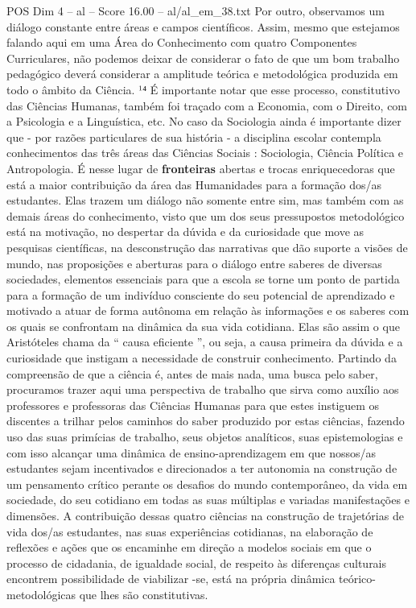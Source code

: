 \begin{textsample}{POS Dim 4 – al – Score 16.00 – al/al\_em\_38.txt}
Por outro, observamos um diálogo constante entre áreas e campos científicos.
Assim, mesmo que estejamos falando aqui em uma Área do Conhecimento com quatro Componentes Curriculares, não podemos deixar de considerar o fato de que um bom trabalho pedagógico deverá considerar a amplitude teórica e metodológica produzida em todo o âmbito da Ciência. ¹⁴ É importante notar que esse processo, constitutivo das Ciências Humanas, também foi traçado com a Economia, com o Direito, com a Psicologia e a Linguística, etc.
No caso da Sociologia ainda é importante dizer que - por razões particulares de sua história - a disciplina escolar contempla conhecimentos das três áreas das Ciências Sociais : Sociologia, Ciência Política e Antropologia.
É nesse lugar de \textbf{fronteiras} abertas e trocas enriquecedoras que está a maior contribuição da área das Humanidades para a formação dos/as estudantes.
Elas trazem um diálogo não somente entre sim, mas também com as demais áreas do conhecimento, visto que um dos seus pressupostos metodológico está na motivação, no despertar da dúvida e da curiosidade que move as pesquisas científicas, na desconstrução das narrativas que dão suporte a visões de mundo, nas proposições e aberturas para o diálogo entre saberes de diversas sociedades, elementos essenciais para que a escola se torne um ponto de partida para a formação de um indivíduo consciente do seu potencial de aprendizado e motivado a atuar de forma autônoma em relação às informações e os saberes com os quais se confrontam na dinâmica da sua vida cotidiana.
Elas são assim o que Aristóteles chama da “ causa eficiente ”, ou seja, a causa primeira da dúvida e a curiosidade que instigam a necessidade de construir conhecimento.
Partindo da compreensão de que a ciência é, antes de mais nada, uma busca pelo saber, procuramos trazer aqui uma perspectiva de trabalho que sirva como auxílio aos professores e professoras das Ciências Humanas para que estes instiguem os discentes a trilhar pelos caminhos do saber produzido por estas ciências, fazendo uso das suas primícias de trabalho, seus objetos analíticos, suas epistemologias e com isso alcançar uma dinâmica de ensino-aprendizagem em que nossos/as estudantes sejam incentivados e direcionados a ter autonomia na construção de um pensamento crítico perante os desafios do mundo contemporâneo, da vida em sociedade, do seu cotidiano em todas as suas múltiplas e variadas manifestações e dimensões.
A contribuição dessas quatro ciências na construção de trajetórias de vida dos/as estudantes, nas suas experiências cotidianas, na elaboração de reflexões e ações que os encaminhe em direção a modelos sociais em que o processo de cidadania, de igualdade social, de respeito às diferenças culturais encontrem possibilidade de viabilizar -se, está na própria dinâmica teórico-metodológicas que lhes são constitutivas.

\end{textsample}
